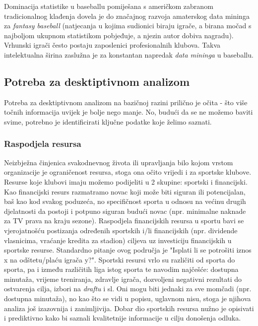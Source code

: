 \documentclass{ferseminar}
\begin{document}
Dominacija statistike u baseballu pomiješana s američkom zabranom tradicionalnog klađenja dovela je do značajnog razvoja amaterskog data mininga za \textit{fantasy baseball} (natjecanja u kojima sudionici biraju igrače, a birana močad s najboljom ukupnom statistikom pobjeđuje, a njezin autor dobiva nagradu). Vrhunski igrači često postaju zaposlenici profesionalnih klubova. Takva intelektualna širina zaslužna je za konstantan napredak \textit{data mininga} u baseballu.

\subsection{Potreba za desktiptivnom analizom}

Potreba za desktiptivnom analizom na bazičnoj razini prilično je očita - što više točnih informacija uvijek je bolje nego manje. No, budući da se ne možemo baviti svime, potrebno je identificirati ključne podatke koje želimo saznati.

\subsubsection{Raspodjela resursa}
Neizbježna činjenica svakodnevnog života ili upravljanja bilo kojom vrstom organizacije je ograničenost resursa, stoga ona očito vrijedi i za sportske klubove. Resurse koje klubovi imaju možemo podijeliti u 2 skupine: sportski i financijski. 
\newline
Kao financijski resurs razmatramo novac koji može biti siguran ili potencijalan, baš kao kod svakog poduzeća, no specifičnost sporta u odnosu na većinu drugih djelatnosti da postoji i potpuno siguran budući novac (npr. minimalne naknade za TV prava na kraju sezone). Raspodjela financijskih resursa u sportu bavi se vjerojatnošću postizanja određenih sportskih i/li financijskih (npr. dividende vlasnicima, vraćanje kredita za stadion) ciljeva uz investiciju financijskih u sportske resurse. Standardno pitanje ovog područja je "Isplati li se potrošiti 
iznos x na odštetu/plaću igrača y?".
\newline
Sportski resursi vrlo su različiti od sporta do sporta, pa i između različitih liga istog sporta te navodim najčešće: dostupna minutaža, vrijeme treniranja, zdravlje igrača, dozvoljeni negativni rezultati do ostvarenja cilja, izbori na \textit{draftu} i sl. Oni mogu biti jednaki za sve momčadi (npr. dostupna minutaža), no kao što se vidi u popisu, uglavnom nisu, stoga je njihova analiza još izazovnija i zanimljivija. Dobar dio sportskih resursa nužno je opisivati i prediktivno kako bi saznali kvalitetnije informacije u cilju donošenja odluka.
\end{document}
